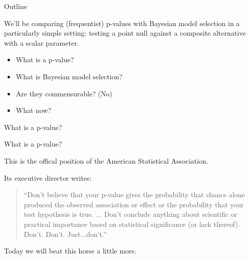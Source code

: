 
\begin{frame}{Outline}

We'll be comparing (frequentist) p-values with Bayesian model selection
in a particularly simple setting: testing a point null against a composite
alternative with a scalar parameter.

\begin{itemize}
    \item What is a p-value?
    \item What is Bayesian model selection?
    \item Are they commensurable?  (No)
    \item What now?
\end{itemize}

\end{frame}



\begin{frame}{What is a p-value?}

What is a p-value?

\vspace{1em}


\vspace{1em}

This is the offical position of the American Statistical Association.

Its executive director writes:

\vspace{1em}

\begin{quote}
``Don’t believe that your p-value gives the probability that chance alone
produced the observed association or effect or the probability that your test
hypothesis is true.  ... Don’t conclude anything about scientific or practical
importance based on statistical significance (or lack thereof).  Don’t. Don’t.
Just...don’t.''  \citep{wasserstein:2019:beyondp}
\end{quote}

\vspace{1em}

\pause Today we will beat this horse a little more.

\end{frame}




